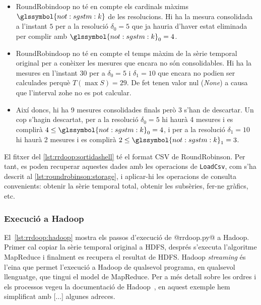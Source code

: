 \begin{itemize}
\item RoundRobindoop no té en compte els cardinals màxims
  $\glssymbol{not:sgstm:k}$ de les resolucions. Hi ha la mesura
  consolidada a l'instant $5$ per a la resolució $\delta_0=5$ que ja
  hauria d'haver estat eliminada per complir amb
  $\glssymbol{not:sgstm:k}_0=4$.

\item RoundRobindoop no té en compte el temps màxim de la sèrie
  temporal original per a conèixer les mesures que encara no són
  consolidables. Hi ha la mesures en l'instant $30$ per a
  $\delta_0=5$ i $\delta_1=10$ que encara no podien ser calculades
  perquè $T(\max S)=29$. De fet tenen valor nul (\emph{None}) a causa
  que l'interval \gls{zohe} no es pot calcular.

\item Així doncs, hi ha 9 mesures consolidades finals però 3 s'han de
  descartar. Un cop s'hagin descartat, per a la resolució $\delta_0=5$
  hi haurà 4 mesures i es complirà $4 \leq \glssymbol{not:sgstm:k}_0=4$,
  i per a la resolució $\delta_1=10$ hi haurà 2 mesures i es complirà $2
  \leq \glssymbol{not:sgstm:k}_1=3$.
\end{itemize}


El fitxer del \autoref{lst:rrdoop:sortidashell} té el format \gls{CSV}
de RoundRobinson. Per tant, es poden recuperar aquestes dades amb les
operacions de \verb+LoadCsv+, com s'ha descrit al
\autoref{lst:roundrobinson:storage}, i aplicar-hi les operacions de
consulta convenients: obtenir la sèrie temporal total, obtenir les
subsèries, fer-ne gràfics, etc.



\subsubsection{Execució a Hadoop}


El~\autoref{lst:rrdoop:hadoop} mostra els passos d'execució de
@rrdoop.py@ a Hadoop. Primer cal copiar la sèrie temporal original a
\gls{HDFS}, després s'executa l'algoritme MapReduce i finalment es
recupera el resultat de \gls{HDFS}.  Hadoop \emph{streaming} és l'eina
que permet l'execució a Hadoop de qualsevol programa, en qualsevol
llenguatge, que tingui el model de MapReduce.  Per a més detall sobre
les ordres i els processos vegeu la documentació de
Hadoop~\parencite{hadoop}, en aquest exemple hem simplificat amb [...]
algunes adreces.


